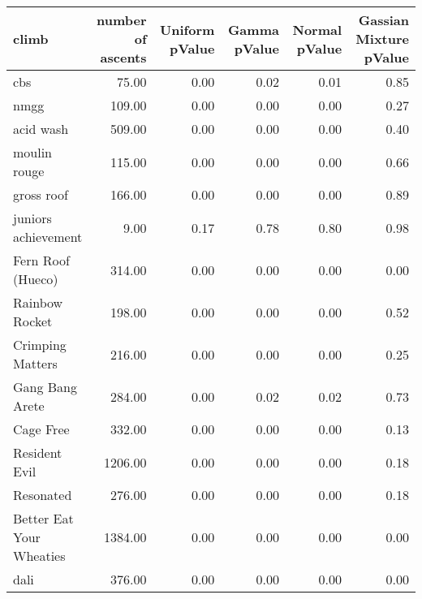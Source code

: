 \begin{tabular}{lrrrrr}
\toprule
                   climb &  number of ascents &  Uniform pValue &  Gamma pValue &  Normal pValue &  Gassian Mixture pValue \\
\midrule
                     cbs &              75.00 &            0.00 &          0.02 &           0.01 &                    0.85 \\
                    nmgg &             109.00 &            0.00 &          0.00 &           0.00 &                    0.27 \\
               acid wash &             509.00 &            0.00 &          0.00 &           0.00 &                    0.40 \\
            moulin rouge &             115.00 &            0.00 &          0.00 &           0.00 &                    0.66 \\
              gross roof &             166.00 &            0.00 &          0.00 &           0.00 &                    0.89 \\
     juniors achievement &               9.00 &            0.17 &          0.78 &           0.80 &                    0.98 \\
       Fern Roof (Hueco) &             314.00 &            0.00 &          0.00 &           0.00 &                    0.00 \\
          Rainbow Rocket &             198.00 &            0.00 &          0.00 &           0.00 &                    0.52 \\
        Crimping Matters &             216.00 &            0.00 &          0.00 &           0.00 &                    0.25 \\
        Gang Bang Arete  &             284.00 &            0.00 &          0.02 &           0.02 &                    0.73 \\
               Cage Free &             332.00 &            0.00 &          0.00 &           0.00 &                    0.13 \\
           Resident Evil &            1206.00 &            0.00 &          0.00 &           0.00 &                    0.18 \\
               Resonated &             276.00 &            0.00 &          0.00 &           0.00 &                    0.18 \\
Better Eat Your Wheaties &            1384.00 &            0.00 &          0.00 &           0.00 &                    0.00 \\
                    dali &             376.00 &            0.00 &          0.00 &           0.00 &                    0.00 \\
\bottomrule
\end{tabular}
